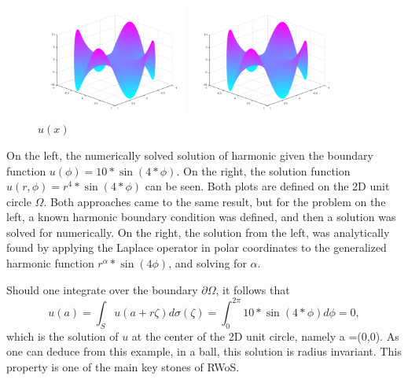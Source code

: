 \begin{figure}[h]
  \centering
  \begin{minipage}[b]{0.4\textwidth}
  \includegraphics[width=5cm]{styles/sinBoundarysovle.png}
  \caption{$u_{sol}(x)$}%
  \label{fig:swingSolve}
\end{minipage}
  \begin{minipage}[b]{0.4\textwidth}
  \includegraphics[width=5cm]{styles/swing_function_plot.png}
  \caption{$u(x)$}%
  \label{fig:swingPlot}
  \end{minipage}
\end{figure}

On the left, the numerically solved solution of harmonic  given the boundary
function $u(\phi)=10*\sin(4*\phi)$.  On the right, the solution function $u(r,\phi)=r^{4}*\sin(4*\phi)$
can be seen. Both plots are defined on the 2D unit circle $\Omega$.  Both approaches
came to the same result, but for the problem on the left, a known harmonic boundary
condition was defined, and then a solution was solved for numerically.  On the right,
the solution from the left, was analytically found by applying the Laplace operator
in polar coordinates to the generalized harmonic function $r^{\alpha}*\sin(4\phi)$,
and solving for $\alpha$.

Should one integrate over the boundary $\partial \Omega$, it follows that \begin{equation}
u(a) = \int_{S}u(a + r\zeta)d\sigma(\zeta) = \int_{0}^{2\pi} 10*\sin(4*\phi)d\phi = 0,
\label{eq:radinvar}
\end{equation}
which is the solution of $u$ at the center of the 2D unit circle,
namely a =(0,0). As one can deduce from this example, in a ball, this solution is
radius invariant.  This property is one of the main key stones of \Gls{RWoS}. \label{radiusInvariance}

